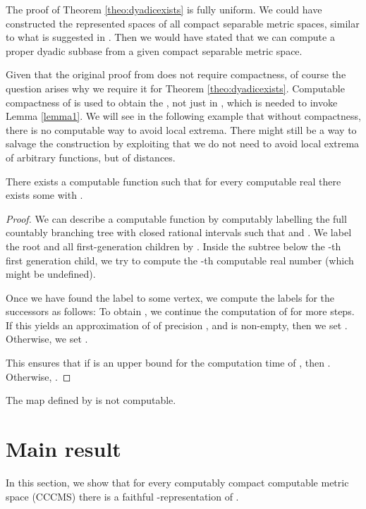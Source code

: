 \documentclass{eptcs-modified}
\begin{document}
The proof of Theorem \ref{theo:dyadicexists} is fully uniform. We could have constructed the represented spaces of all compact separable metric spaces, similar to what is suggested in \cite{rettinger2}. Then we would have stated that we can compute a proper dyadic subbase from a given compact separable metric space.

Given that the original proof from \cite[Section 3.1]{tsukamoto} does not require compactness, of course the question arises why we require it for Theorem \ref{theo:dyadicexists}. Computable compactness of  is used to obtain the , not just in , which is needed to invoke Lemma \ref{lemma1}. We will see in the following example that without compactness, there is no computable way to avoid local extrema. There might still be a way to salvage the construction by exploiting that we do not need to avoid local extrema of arbitrary functions, but of distances.

\begin{example}
There exists a computable function  such that for every computable real  there exists some  with .
\begin{proof}
We can describe a computable function  by computably labelling the full countably branching tree  with closed rational intervals  such that  and . We label the root and all first-generation children by . Inside the subtree below the -th first generation child, we try to compute the -th computable real number  (which might be undefined).

Once we have found the label  to some vertex, we compute the labels for the successors as follows: To obtain , we continue the computation of  for  more steps. If this yields an approximation  of  of precision , and  is non-empty, then we set . Otherwise, we set .

This ensures that if  is an upper bound for the computation time of , then . Otherwise, .
\end{proof}
\end{example}

\begin{corollary}
The map  defined by  is not computable.
\end{corollary}

\section{Main result}
\label{sec:mainresult}
In this section, we show that for every computably compact computable metric space (CCCMS)  there is a faithful -representation of .
\end{document}
